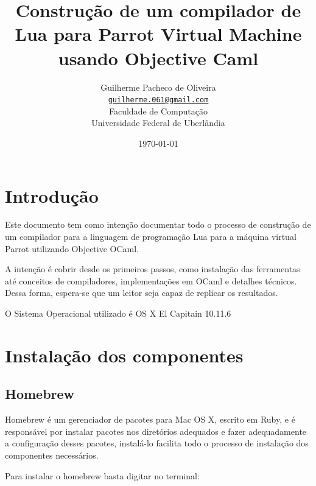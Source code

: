 \documentclass[12pt,a4paper,twoside]{report}
\title{Construção de um compilador de Lua para Parrot Virtual Machine usando Objective Caml}
\date{}
\author{Guilherme Pacheco de Oliveira \\
\texttt{\small \url{guilherme.061@gmail.com}}
\vspace{1cm} \\
Faculdade de Computação \\
Universidade Federal de Uberlândia
}
\date{\today}
\begin{document}
  \maketitle
\listoffigures
\listoftables
\lstlistoflistings

\tableofcontents


\fancyhead[RE,LO]{\thesection}

\setlength{\parskip}{0.15in} %

\chapter{Introdução}
Este documento tem como intenção documentar todo o processo de construção de um compilador para a linguagem de programação Lua para a máquina virtual Parrot utilizando Objective OCaml.

A intenção é cobrir desde os primeiros passos, como instalação das ferramentas até conceitos de compiladores, implementações em OCaml e detalhes técnicos. Dessa forma, espera-se que um leitor seja capaz de replicar os resultados.

O Sistema Operacional utilizado é OS X El Capitain 10.11.6

\chapter{Instalação dos componentes}
\section{Homebrew}
Homebrew é um gerenciador de pacotes para Mac OS X, escrito em Ruby, e
é responsável por instalar pacotes nos diretórios adequados e fazer
adequadamente a configuração desses pacotes, instalá-lo facilita todo
o processo de instalação dos componentes necessários.

Para instalar o homebrew basta digitar no terminal:

\end{document}
